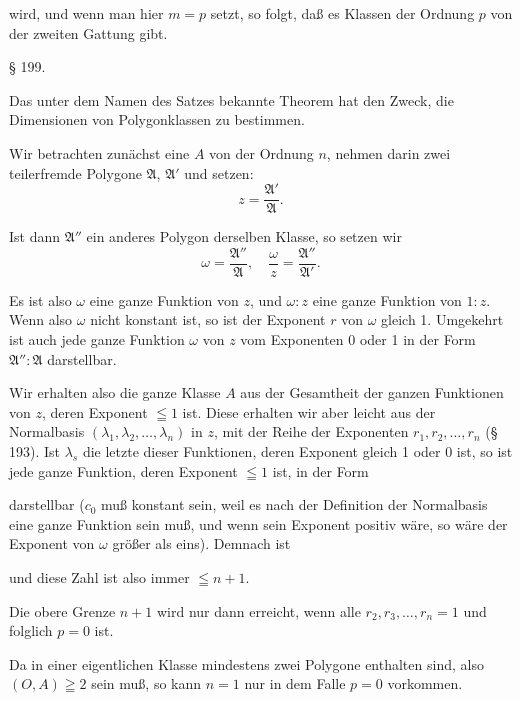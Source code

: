 wird, und wenn man hier $m=p$ setzt, so folgt, daß es Klassen
der Ordnung $p$ von der zweiten Gattung gibt.

\begin{center}
§ 199. 
\end{center}

Das unter dem Namen des  Satzes
bekannte Theorem hat den Zweck, die Dimensionen von Polygonklassen
 zu bestimmen.

Wir betrachten zunächst eine 
 $A$ von der Ordnung $n$, nehmen darin zwei teilerfremde
Polygone $\mathfrak{A}$, $\mathfrak{A}'$ und setzen:
\[
z = \frac{\mathfrak{A}'}{\mathfrak{A}}.
\]

Ist dann $\mathfrak{A}''$ ein anderes Polygon derselben Klasse, so
setzen wir
\[
\omega = \frac{\mathfrak{A}''}{\mathfrak{A}},\quad \frac{\omega}{z} = \frac{\mathfrak{A}''}{\mathfrak{A}'}.
\]

Es ist also $\omega$ eine ganze Funktion von $z$, und $\omega:z$ eine
ganze Funktion von $1:z$. Wenn also $\omega$ nicht konstant ist, so ist
der Exponent $r$ von $\omega$ gleich 1. Umgekehrt ist auch jede ganze
Funktion $\omega$ von $z$ vom Exponenten 0 oder 1 in der Form
$\mathfrak{A}'':\mathfrak{A}$ darstellbar.

Wir erhalten also die ganze Klasse $A$ aus der Gesamtheit
der ganzen Funktionen von $z$, deren Exponent $\leqq 1$ ist. Diese
erhalten wir aber leicht aus der Normalbasis $(\lambda_1, \lambda_2, \ldots, \lambda_n)$ in $z$,
mit der Reihe der Exponenten $r_1, r_2, \ldots, r_n$ (§ 193). Ist $\lambda_s$ die
letzte dieser Funktionen, deren Exponent gleich 1 oder 0 ist, so
ist jede ganze Funktion, deren Exponent $\leqq 1$ ist, in der Form


darstellbar ($c_0$ muß konstant sein, weil es nach der Definition
der Normalbasis eine ganze Funktion sein muß, und wenn sein
Exponent positiv wäre, so wäre der Exponent von $\omega$ größer als
eins). Demnach ist


und diese Zahl ist also immer $\leqq n + 1$.

Die obere Grenze $n+1$ wird nur dann erreicht, wenn alle
$r_2, r_3, \ldots, r_n = 1$ und folglich $p = 0$ ist.

Da in einer eigentlichen Klasse mindestens zwei Polygone
enthalten sind, also $(O, A) \geqq 2$ sein muß, so kann $n = 1$ nur
in dem Falle $p = 0$ vorkommen.
